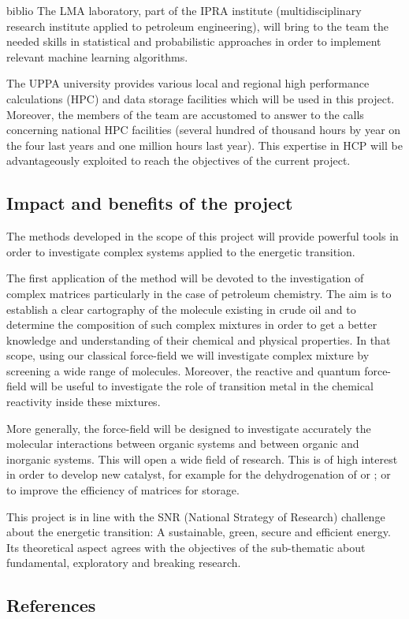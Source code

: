 \documentclass[11pt]{artuppax}
\newcounter{subsec}[section]
\begin{document}
\begin{btSect}{biblio}
The LMA laboratory, part of the IPRA institute (multidisciplinary research institute applied to petroleum engineering), will bring to the team the needed skills in statistical and probabilistic approaches in order to implement relevant machine learning algorithms.

The UPPA university provides various local and regional high performance calculations (HPC) and data storage facilities which will be used in this project. Moreover, the members of the team are accustomed to answer to the calls concerning national HPC facilities (several hundred of thousand hours by year on the four last years and one million hours last year). This expertise in HCP will be advantageously exploited to reach the objectives of the current project.

\subsection{Impact and benefits of the project}

The methods developed in the scope of this project will provide powerful tools in order to investigate complex systems applied to the energetic transition.

The first application of the method will be devoted to the investigation of complex matrices particularly in the case of petroleum chemistry. The aim is to establish a clear cartography of the molecule existing in crude oil and to determine the composition of such complex mixtures in order to get a better knowledge and understanding of their chemical and physical properties. In that scope, using our classical force-field we will investigate complex mixture by screening a wide range of molecules. Moreover, the reactive and quantum force-field will be useful to investigate the role of transition metal in the chemical reactivity inside these mixtures.

More generally, the force-field will be designed to investigate accurately the molecular interactions between organic systems and between organic and inorganic systems. This will open a wide field of research. This is of high interest in order to develop new catalyst, for example for the dehydrogenation of  or ; or to improve the efficiency of matrices for  storage.

This project is in line with the SNR (National Strategy of Research) challenge about the energetic transition: A sustainable, green, secure and efficient energy. Its theoretical aspect agrees with the objectives of the sub-thematic about fundamental, exploratory and breaking research.

\singlespacing
\subsection*{References}
\setlength{\bibsep}{2pt}
\btPrintCited

\end{btSect}
\end{document}
